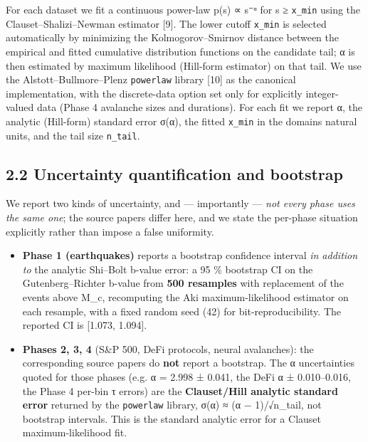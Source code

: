\documentclass[
  11pt]{article}
\providecommand{\tightlist}{%
  \setlength{\itemsep}{0pt}\setlength{\parskip}{0pt}}
\begin{document}
For each dataset we fit a continuous power-law p(s) ∝ s⁻ᵅ for s ≥
\texttt{x\_min} using the Clauset--Shalizi--Newman estimator {[}9{]}.
The lower cutoff \texttt{x\_min} is selected automatically by minimizing
the Kolmogorov--Smirnov distance between the empirical and fitted
cumulative distribution functions on the candidate tail; α is then
estimated by maximum likelihood (Hill-form estimator) on that tail. We
use the Alstott--Bullmore--Plenz \texttt{powerlaw} library {[}10{]} as
the canonical implementation, with the discrete-data option set only for
explicitly integer-valued data (Phase 4 avalanche sizes and durations).
For each fit we report α, the analytic (Hill-form) standard error σ(α),
the fitted \texttt{x\_min} in the domain\textquotesingle s natural
units, and the tail size \texttt{n\_tail}.

\subsection{2.2 Uncertainty quantification and
bootstrap}\label{22-uncertainty-quantification-and-bootstrap}

We report two kinds of uncertainty, and --- importantly --- \emph{not
every phase uses the same one}; the source papers differ here, and we
state the per-phase situation explicitly rather than impose a false
uniformity.

\begin{itemize}
\tightlist
\item
  \textbf{Phase 1 (earthquakes)} reports a bootstrap confidence interval
  \emph{in addition to} the analytic Shi--Bolt b-value error: a 95 \%
  bootstrap CI on the Gutenberg--Richter b-value from \textbf{500
  resamples} with replacement of the events above M\_c, recomputing the
  Aki maximum-likelihood estimator on each resample, with a fixed random
  seed (42) for bit-reproducibility. The reported CI is {[}1.073,
  1.094{]}.
\item
  \textbf{Phases 2, 3, 4} (S\&P 500, DeFi protocols, neural avalanches):
  the corresponding source papers do \textbf{not} report a bootstrap.
  The α uncertainties quoted for those phases (e.g. α = 2.998 ± 0.041,
  the DeFi α ± 0.010--0.016, the Phase 4 per-bin τ errors) are the
  \textbf{Clauset/Hill analytic standard error} returned by the
  \texttt{powerlaw} library, σ(α) ≈ (α − 1)/√n\_tail, not bootstrap
  intervals. This is the standard analytic error for a Clauset
  maximum-likelihood fit.
\end{itemize}
\end{document}
